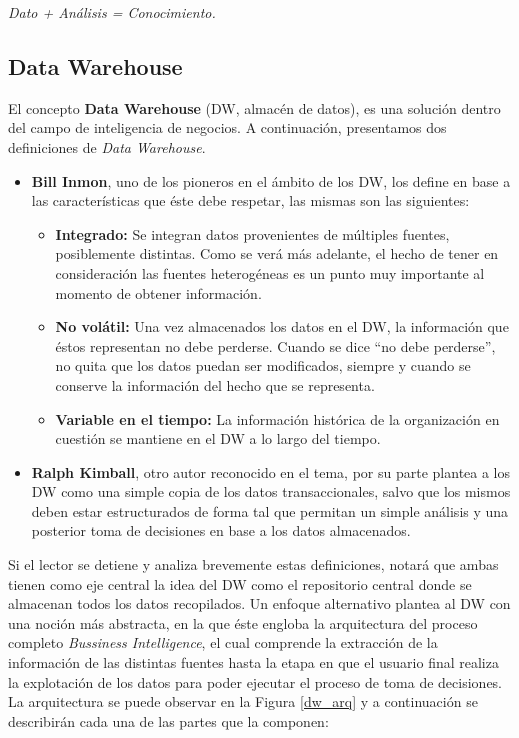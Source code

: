 \documentclass[a4paper,11pt]{article}
\begin{document}
    \begin{center}
      \textit{Dato + Análisis = Conocimiento.}
    \end{center}


    \subsection{Data Warehouse}
    
    El concepto \textbf{Data Warehouse} (DW, almacén de datos), es una solución dentro del campo de inteligencia de negocios.
    A continuación, presentamos dos definiciones de \textit{Data Warehouse}.

    \begin{itemize}
      \item \textbf{Bill Inmon}, uno de los pioneros en el ámbito de los DW, los define en base a las características que éste debe respetar, las mismas son
      las siguientes:
      \begin{itemize}
        \item \textbf{Integrado:} Se integran datos provenientes de múltiples fuentes, posiblemente distintas. Como se verá más adelante, el hecho de tener
        en consideración las fuentes heterogéneas es un punto muy importante al momento de obtener información.
        \item \textbf{No volátil:} Una vez almacenados los datos en el DW, la información que éstos representan no debe perderse. Cuando se dice
        ``no debe perderse'', no quita que los datos puedan ser modificados, siempre y cuando se conserve la información del hecho que se representa.
        \item \textbf{Variable en el tiempo:} La información histórica de la organización en cuestión se mantiene en el DW a lo largo del tiempo.
      \end{itemize}
      \item \textbf{Ralph Kimball}, otro autor reconocido en el tema, por su parte plantea a los DW como una simple copia de los datos transaccionales,
      salvo que los mismos deben estar estructurados de forma tal que permitan un simple análisis y una posterior toma de decisiones en base a los
      datos almacenados.
    \end{itemize}
    
    Si el lector se detiene y analiza brevemente estas definiciones, notará que ambas tienen como eje central la idea del DW como el repositorio central
    donde se almacenan todos los datos recopilados. Un enfoque alternativo plantea al DW con una noción más abstracta, en la que éste engloba
    la arquitectura del proceso completo \textit{Bussiness Intelligence}, el cual comprende la
    extracción de la información de las distintas fuentes hasta la etapa en que el usuario final realiza la explotación de los datos para poder ejecutar el
    proceso de toma de decisiones. La arquitectura se puede observar en la Figura \ref{dw_arq} y a continuación se describirán cada
    una de las partes que la componen:
\end{document}
